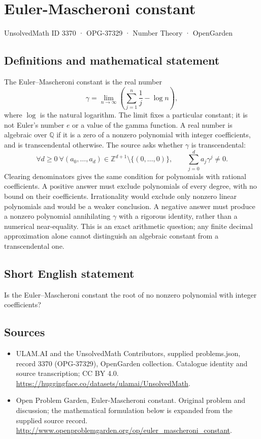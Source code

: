\documentclass[11pt,a4paper]{article}
\begin{document}
\section*{Euler-Mascheroni constant}\label{3370}
{\small UnsolvedMath ID 3370 · OPG-37329 · Number Theory · OpenGarden}
\subsection{Definitions and mathematical statement}
The Euler--Mascheroni constant is the real number
\[
 \gamma=\lim_{n\to\infty}\left(\sum_{j=1}^{n}\frac1j-\log n\right),
\]
where $\log$ is the natural logarithm. The limit fixes a particular
constant; it is not Euler's number $e$ or a value of the gamma function.
A real number is algebraic over $\mathbb Q$ if it is a zero of a
nonzero polynomial with integer coefficients, and is transcendental
otherwise. The source asks whether $\gamma$ is transcendental:
\[
 \forall d\ge0\ \forall(a_0,\ldots,a_d)\in\mathbb Z^{d+1}
       \setminus\{(0,\ldots,0)\},\qquad
                   \sum_{j=0}^{d}a_j\gamma^j\ne0.
\]
Clearing denominators gives the same condition for polynomials with
rational coefficients. A positive answer must exclude polynomials of
every degree, with no bound on their coefficients. Irrationality
would exclude only nonzero linear polynomials and would be a weaker
conclusion. A negative answer must produce a nonzero polynomial
annihilating $\gamma$ with a rigorous identity, rather than a numerical
near-equality. This is an exact arithmetic question; any finite decimal
approximation alone cannot distinguish an algebraic constant from a
transcendental one.
\subsection{Short English statement}
Is the Euler--Mascheroni constant the root of no nonzero polynomial with integer coefficients?
\subsection{Sources}
\begin{itemize}
\item[S1] ULAM.AI and the UnsolvedMath Contributors, supplied problems.json, record 3370 (OPG-37329), OpenGarden collection. Catalogue identity and source transcription; CC BY 4.0.
\url{https://huggingface.co/datasets/ulamai/UnsolvedMath}.
\item[S2] Open Problem Garden, Euler-Mascheroni constant. Original problem and discussion; the mathematical formulation below is expanded from the supplied source record.
\url{http://www.openproblemgarden.org/op/euler_mascheroni_constant}.
\end{itemize}
\end{document}
